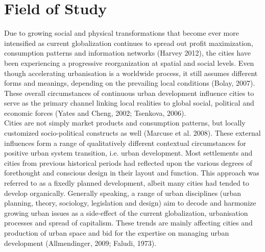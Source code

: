 \documentclass[11pt]{report}
\begin{document}
\section{Field of Study}
Due to growing social and physical transformations that become ever more intensified as current globalization continues to spread out profit maximization, consumption patterns and information networks (Harvey 2012), the cities have been experiencing a progressive reorganization at spatial and social levels. Even though accelerating urbanisation is a worldwide process, it still assumes different forms and meanings, depending on the prevailing local conditions (Bolay, 2007). These overall circumstances of continuous urban development influence cities to serve as the primary channel linking local realities to global social, political and economic forces (Yates and Cheng, 2002; Tsenkova, 2006).
\\
Cities are not simply market products and consumption patterns, but locally customized socio-political constructs as well (Marcuse et al. 2008). These external influences form a range of qualitatively different contextual circumstances for positive urban system transition, i.e. urban development. Most settlements and cities from previous historical periods had reflected upon the various degrees of forethought and conscious design in their layout and function. This approach was referred to as a fixedly planned development, albeit many cities had tended to develop organically. Generally speaking, a range of urban disciplines (urban planning, theory, sociology, legislation and design) aim to decode and harmonize growing urban issues as a side-effect of the current globalization, urbanisation processes and spread of capitalism. These trends are mainly affecting cities and production of urban space and bid for the expertise on managing urban development (Allmendinger, 2009; Faludi, 1973). 
\\
\end{document}
